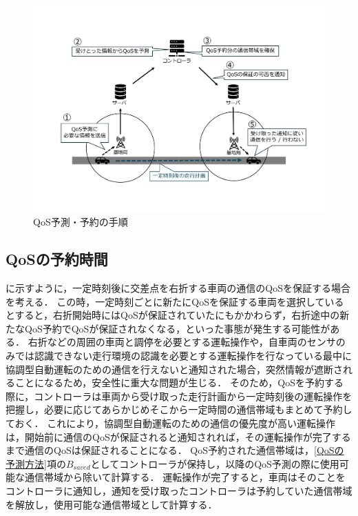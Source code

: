 \documentclass[a4paper,11pt,uplatex]{ujreport}
\begin{document}
  \begin{figure}[tb]
    \centering
    \includegraphics[width=\linewidth]{img/QoS予測・予約の手順.pdf}
    \caption{QoS予測・予約の手順}
    \label{fig:QoSReservation}
  \end{figure}

\subsection{QoSの予約時間}

に示すように，一定時刻後に交差点を右折する車両の通信のQoSを保証する場合を考える．
この時，一定時刻ごとに新たにQoSを保証する車両を選択しているとすると，右折開始時にはQoSが保証されていたにもかかわらず，右折途中の新たなQoS予約でQoSが保証されなくなる，といった事態が発生する可能性がある．
右折などの周囲の車両と調停を必要とする運転操作や，自車両のセンサのみでは認識できない走行環境の認識を必要とする運転操作を行なっている最中に協調型自動運転のための通信を行えないと通知された場合，突然情報が遮断されることになるため，安全性に重大な問題が生じる．
そのため，QoSを予約する際に，コントローラは車両から受け取った走行計画から一定時刻後の運転操作を把握し，必要に応じてあらかじめそこから一定時間の通信帯域もまとめて予約しておく．
これにより，協調型自動運転のための通信の優先度が高い運転操作は，開始前に通信のQoSが保証されると通知されれば，その運転操作が完了するまで通信のQoSは保証されることになる．
QoS予約された通信帯域は，\ref{QoSの予測方法}項の$B_{saved}$としてコントローラが保持し，以降のQoS予測の際に使用可能な通信帯域から除いて計算する．
運転操作が完了すると，車両はそのことをコントローラに通知し，通知を受け取ったコントローラは予約していた通信帯域を解放し，使用可能な通信帯域として計算する．
\end{document}
